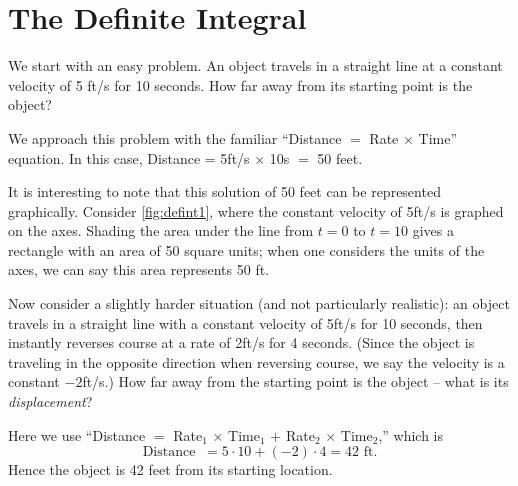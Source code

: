 \section{The Definite Integral}\label{sec:def_int}

We start with an easy problem. An object travels in a straight line at a constant velocity of 5 ft/s for 10 seconds. How far away from its starting point is the object?

We approach this problem with the familiar ``Distance $=$ Rate $\times$ Time'' equation. In this case, Distance = 5ft/s $\times$ 10s $=$ 50 feet.

It is interesting to note that this solution of 50 feet can be represented graphically. Consider \autoref{fig:defint1}, where the constant velocity of 5ft/s is graphed on the axes. Shading the area under the line from $t=0$ to $t=10$ gives a rectangle with an area of 50 square units; when one considers the units of the axes, we can say this area represents 50 ft.


Now consider a slightly harder situation (and not particularly realistic): an object travels in a straight line with a constant velocity of 5ft/s for 10 seconds, then instantly reverses course at a rate of 2ft/s for 4 seconds. (Since the object is traveling in the opposite direction when reversing course, we say the velocity is a constant $-2$ft/s.) How far away from the starting point is the object -- what is its \textit{displacement}?

Here we use ``Distance $=$ Rate$_1$ $\times$ Time$_1$ + Rate$_2$ $\times$ Time$_2$,'' which is 
\[\text{Distance } \ = 5\cdot10 + (-2)\cdot 4 = 42\text{ ft.}\]
Hence the object is 42 feet from its starting location.

